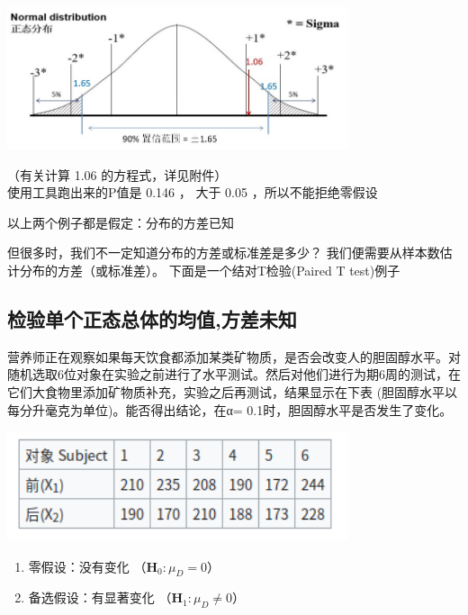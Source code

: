 
\includegraphics[width=10cm]{M4twoPopulationScreenshot_2022-09-11_201946.jpg}

（有关计算 1.06 的方程式，详见附件）\\
使用工具跑出来的P值是 0.146 ， 大于 0.05 ，所以不能拒绝零假设

以上两个例子都是假定：分布的方差已知

但很多时，我们不一定知道分布的方差或标准差是多少？
我们便需要从样本数估计分布的方差（或标准差）。
下面是一个结对T检验(Paired T test)例子

\hypertarget{ux68c0ux9a8cux5355ux4e2aux6b63ux6001ux603bux4f53ux7684ux5747ux503cux65b9ux5deeux672aux77e5}{%
\subsection{检验单个正态总体的均值,方差未知}\label{ux68c0ux9a8cux5355ux4e2aux6b63ux6001ux603bux4f53ux7684ux5747ux503cux65b9ux5deeux672aux77e5}}

营养师正在观察如果每天饮食都添加某类矿物质，是否会改变人的胆固醇水平。对随机选取6位对象在实验之前进行了水平测试。然后对他们进行为期6周的测试，在它们大食物里添加矿物质补充，实验之后再测试，结果显示在下表
(胆固醇水平以每分升毫克为单位)。能否得出结论，在α=
0.1时，胆固醇水平是否发生了变化。


\includegraphics[width=10cm]{Screenshotfrom2022-12-2822-37-19.png}

\begin{enumerate}
\tightlist
\item
  零假设：没有变化 （\(\mathbf{H}_0: \mu _D = 0\)）
\item
  备选假设：有显著变化 （\(\mathbf{H}_1: \mu _D \neq 0\)）
\end{enumerate}

